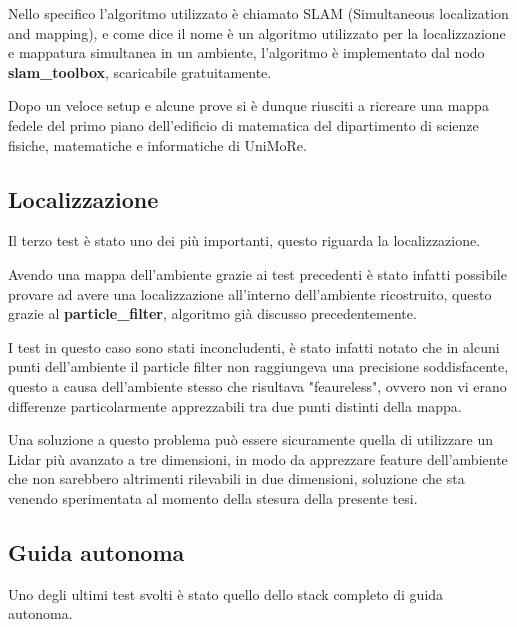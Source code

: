 \noindent Nello specifico l'algoritmo utilizzato è chiamato SLAM (Simultaneous localization and mapping), e come dice il nome è un algoritmo utilizzato per la localizzazione e mappatura simultanea in un ambiente, l'algoritmo è implementato dal nodo \textbf{slam\_toolbox}, scaricabile gratuitamente.

\noindent Dopo un veloce setup e alcune prove si è dunque riusciti a ricreare una mappa fedele del primo piano dell'edificio di matematica del dipartimento di scienze fisiche, matematiche e informatiche di UniMoRe.

\subsection{Localizzazione}
Il terzo test è stato uno dei più importanti, questo riguarda la localizzazione.

\noindent Avendo una mappa dell'ambiente grazie ai test precedenti è stato infatti possibile provare ad avere una localizzazione all'interno dell'ambiente ricostruito, questo grazie al \textbf{particle\_filter}, algoritmo già discusso precedentemente.

\noindent I test in questo caso sono stati inconcludenti, è stato infatti notato che in alcuni punti dell'ambiente il particle filter non raggiungeva una precisione soddisfacente, questo a causa dell'ambiente stesso che risultava "feaureless", ovvero non vi erano differenze particolarmente apprezzabili tra due punti distinti della mappa.

\noindent Una soluzione a questo problema può essere sicuramente quella di utilizzare un Lidar più avanzato a tre dimensioni, in modo da apprezzare feature dell'ambiente che non sarebbero altrimenti rilevabili in due dimensioni, soluzione che sta venendo sperimentata al momento della stesura della presente tesi.

\subsection{Guida autonoma}
Uno degli ultimi test svolti è stato quello dello stack completo di guida autonoma. 
